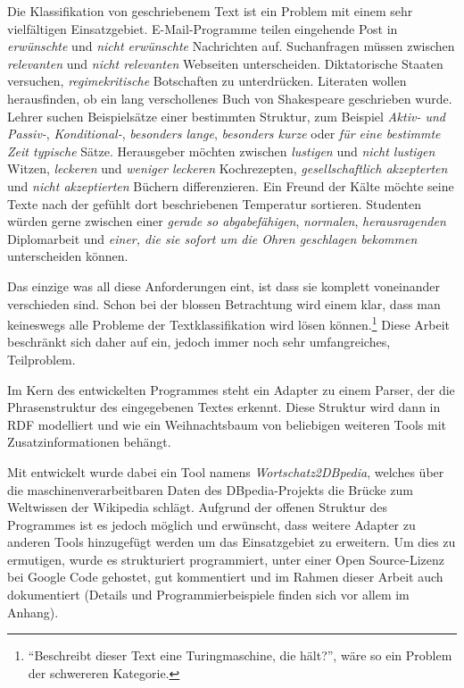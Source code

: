 \iffalse
Die Klassifikation von geschriebenem Text ist ein Problem mit einem sehr vielfältigen Einsatzgebiet.
E-Mail-Programme teilen eingehende Post in \emph{erwünschte} und \emph{nicht erwünschte} Nachrichten auf.
Suchanfragen müssen zwischen \emph{relevanten} und \emph{nicht relevanten} Webseiten unterscheiden.
Diktatorische Staaten versuchen, \emph{regimekritische} Botschaften zu unterdrücken.
Literaten wollen herausfinden, ob ein lang verschollenes Buch von Shakespeare geschrieben wurde.
Lehrer suchen Beispielsätze einer bestimmten Struktur, zum Beispiel \emph{Aktiv- und Passiv-}, \emph{Konditional-}, \emph{besonders lange}, \emph{besonders kurze} oder \emph{für eine bestimmte Zeit typische} Sätze.
Herausgeber möchten zwischen \emph{lustigen} und \emph{nicht lustigen} Witzen, \emph{leckeren} und \emph{weniger leckeren} Kochrezepten,
\emph{gesellschaftlich akzepterten} und \emph{nicht akzeptierten} Büchern differenzieren.
Ein Freund der Kälte möchte seine Texte nach der gefühlt dort beschriebenen Temperatur sortieren.
Studenten würden gerne zwischen einer \emph{gerade so abgabefähigen}, \emph{normalen}, \emph{herausragenden} Diplomarbeit und \emph{einer, die sie sofort um die Ohren geschlagen bekommen} unterscheiden können.

Das einzige was all diese Anforderungen eint, ist dass sie komplett voneinander verschieden sind.
Schon bei der blossen Betrachtung wird einem klar, dass man keineswegs alle Probleme der Textklassifikation wird lösen können.\footnote{"`Beschreibt dieser Text eine Turingmaschine, die hält?"', wäre so ein
Problem der schwereren Kategorie.}
Diese Arbeit beschränkt sich daher auf ein, jedoch immer noch sehr umfangreiches, Teilproblem.

Im Kern des entwickelten Programmes steht ein Adapter zu einem Parser, der die Phrasenstruktur des eingegebenen Textes erkennt. Diese Struktur wird dann in RDF modelliert und wie ein Weihnachtsbaum 
von beliebigen weiteren Tools mit Zusatzinformationen behängt.

Mit entwickelt wurde dabei ein Tool namens \emph{Wortschatz2DBpedia}, welches über die maschinenverarbeitbaren Daten des DBpedia-Projekts die Brücke zum Weltwissen der Wikipedia schlägt.
Aufgrund der offenen Struktur des Programmes ist es jedoch möglich und erwünscht, dass weitere Adapter zu anderen Tools hinzugefügt werden um das Einsatzgebiet zu erweitern.
Um dies zu ermutigen, wurde es strukturiert programmiert, unter einer Open Source-Lizenz bei Google Code gehostet, gut kommentiert und im Rahmen dieser Arbeit auch dokumentiert
(Details und Programmierbeispiele finden sich vor allem im Anhang).


